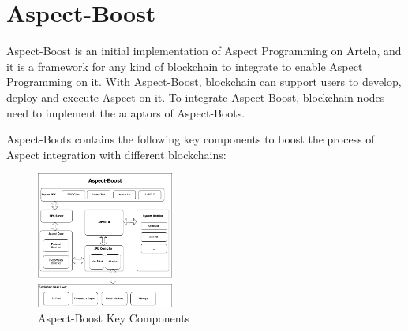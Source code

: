 \section{Aspect-Boost}
Aspect-Boost is an initial implementation of Aspect Programming on Artela, and it is a framework for any kind of blockchain to integrate to enable Aspect Programming on it. With Aspect-Boost, blockchain can support users to develop, deploy and execute Aspect on it. To integrate Aspect-Boost, blockchain nodes need to implement the adaptors of Aspect-Boots.

Aspect-Boots contains the following key components to boost the process of Aspect integration with different blockchains:

\begin{figure}[h]
  \centering
  \includegraphics[width=0.4\textwidth]{sections/aspect-boost.png}
  \caption{Aspect-Boost Key Components}
\end{figure}

